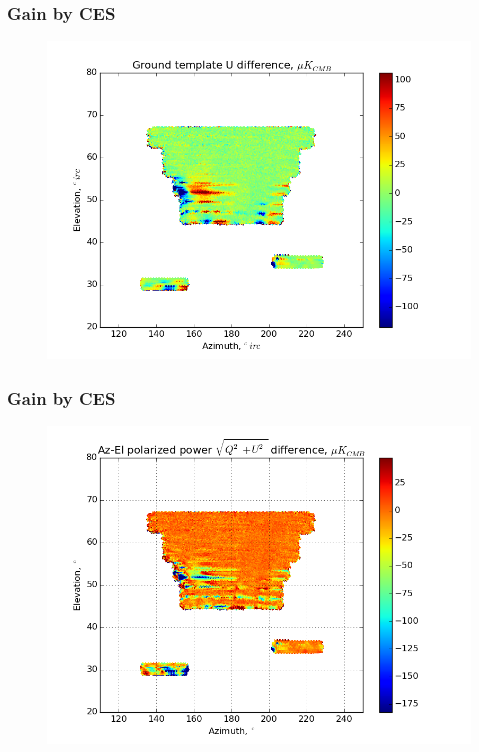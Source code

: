 \documentclass{beamer}
\begin{document}
\begin{frame}
\frametitle{Gain by CES}
\begin{figure}
\includegraphics[width=0.9\linewidth]{dU_gt_GAIN_BY_CES.png}
\end{figure}
\end{frame}

\begin{frame}
\frametitle{Gain by CES}
\begin{figure}
\includegraphics[width=0.9\linewidth]{dMag_gt_GAIN_BY_CES.png}
\end{figure}
\end{frame}
\end{document}
